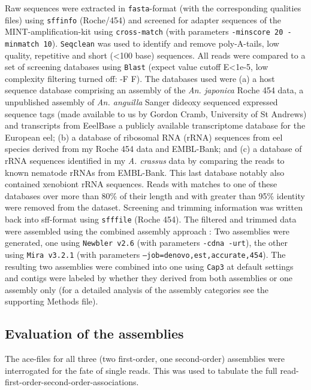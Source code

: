 Raw sequences were extracted in \texttt{fasta}-format (with the
corresponding qualities files) using \texttt{sffinfo} (Roche/454) and
screened for adapter sequences of the MINT-amplification-kit using
\texttt{cross-match} \cite{PHRAP} (with parameters \texttt{-minscore
  20 -minmatch 10}). \texttt{Seqclean} \cite{tgicl_pertea} was used to
identify and remove poly-A-tails, low quality, repetitive and short
(<100 base) sequences. All reads were compared to a set of screening
databases using \texttt{Blast} (expect value cutoff E<1e-5, low
complexity filtering turned off: -F F). The databases used were (a) a
host sequence database comprising an assembly of the
\textit{An. japonica} Roche 454 data, a unpublished assembly of
\textit{An. anguilla} Sanger dideoxy sequenced expressed sequence tags
(made available to us by Gordon Cramb, University of St Andrews) and
transcripts from EeelBase \cite{pmid21080939} a publicly available
transcriptome database for the European eel; (b) a database of
ribosomal RNA (rRNA) sequences from eel species derived from my Roche
454 data and EMBL-Bank; and (c) a database of rRNA sequences
identified in my \textit{A. crassus} data by comparing the reads to
known nematode rRNAs from EMBL-Bank. This last database notably also
contained xenobiont rRNA sequences. Reads with matches to one of these
databases over more than 80\% of their length and with greater than
95\% identity were removed from the dataset. Screening and trimming
information was written back into sff-format using \texttt{sfffile}
(Roche 454). The filtered and trimmed data were assembled using the
combined assembly approach \cite{pmid20950480}: Two assemblies were
generated, one using \texttt{Newbler v2.6} \cite{pmid16056220} (with
parameters \texttt{-cdna -urt}), the other using \texttt{Mira v3.2.1}
\cite{miraEST} (with parameters
\texttt{--job=denovo,est,accurate,454}). The resulting two assemblies
were combined into one using \texttt{Cap3} \cite{Cap3_Huang} at
default settings and contigs were labeled by whether they derived from
both assemblies or one assembly only (for a detailed analysis of the
assembly categories see the supporting Methods file).

\subsection{Evaluation of the assemblies}

The ace-files for all three (two first-order, one second-order)
assemblies were interrogated for the fate of single reads. This was
used to tabulate the full read-first-order-second-order-associations.

